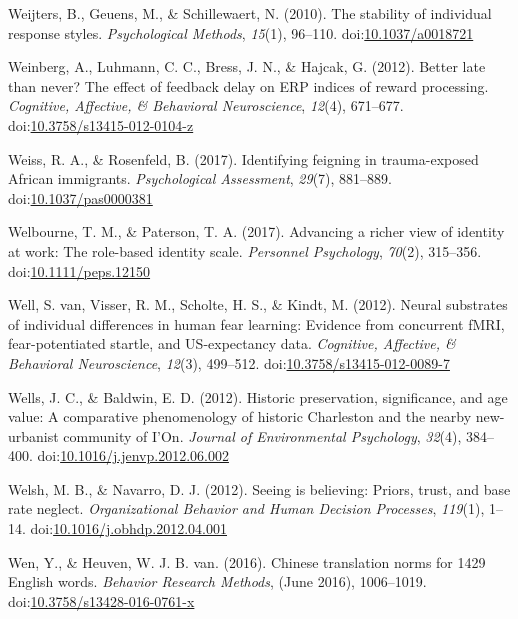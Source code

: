 \documentclass[english,man]{apa6}
\theoremstyle{definition}
\theoremstyle{definition}
\theoremstyle{definition}
\theoremstyle{remark}
\begin{document}
\hypertarget{ref-Weijters2010}{}
Weijters, B., Geuens, M., \& Schillewaert, N. (2010). The stability of
individual response styles. \emph{Psychological Methods}, \emph{15}(1),
96--110. doi:\href{https://doi.org/10.1037/a0018721}{10.1037/a0018721}

\hypertarget{ref-Weinberg2012}{}
Weinberg, A., Luhmann, C. C., Bress, J. N., \& Hajcak, G. (2012). Better
late than never? The effect of feedback delay on ERP indices of reward
processing. \emph{Cognitive, Affective, \& Behavioral Neuroscience},
\emph{12}(4), 671--677.
doi:\href{https://doi.org/10.3758/s13415-012-0104-z}{10.3758/s13415-012-0104-z}

\hypertarget{ref-Weiss2017}{}
Weiss, R. A., \& Rosenfeld, B. (2017). Identifying feigning in
trauma-exposed African immigrants. \emph{Psychological Assessment},
\emph{29}(7), 881--889.
doi:\href{https://doi.org/10.1037/pas0000381}{10.1037/pas0000381}

\hypertarget{ref-Welbourne2017}{}
Welbourne, T. M., \& Paterson, T. A. (2017). Advancing a richer view of
identity at work: The role-based identity scale. \emph{Personnel
Psychology}, \emph{70}(2), 315--356.
doi:\href{https://doi.org/10.1111/peps.12150}{10.1111/peps.12150}

\hypertarget{ref-VanWell2012}{}
Well, S. van, Visser, R. M., Scholte, H. S., \& Kindt, M. (2012). Neural
substrates of individual differences in human fear learning: Evidence
from concurrent fMRI, fear-potentiated startle, and US-expectancy data.
\emph{Cognitive, Affective, \& Behavioral Neuroscience}, \emph{12}(3),
499--512.
doi:\href{https://doi.org/10.3758/s13415-012-0089-7}{10.3758/s13415-012-0089-7}

\hypertarget{ref-Wells2012}{}
Wells, J. C., \& Baldwin, E. D. (2012). Historic preservation,
significance, and age value: A comparative phenomenology of historic
Charleston and the nearby new-urbanist community of I'On. \emph{Journal
of Environmental Psychology}, \emph{32}(4), 384--400.
doi:\href{https://doi.org/10.1016/j.jenvp.2012.06.002}{10.1016/j.jenvp.2012.06.002}

\hypertarget{ref-Welsh2012}{}
Welsh, M. B., \& Navarro, D. J. (2012). Seeing is believing: Priors,
trust, and base rate neglect. \emph{Organizational Behavior and Human
Decision Processes}, \emph{119}(1), 1--14.
doi:\href{https://doi.org/10.1016/j.obhdp.2012.04.001}{10.1016/j.obhdp.2012.04.001}

\hypertarget{ref-Wen2016}{}
Wen, Y., \& Heuven, W. J. B. van. (2016). Chinese translation norms for
1429 English words. \emph{Behavior Research Methods}, (June 2016),
1006--1019.
doi:\href{https://doi.org/10.3758/s13428-016-0761-x}{10.3758/s13428-016-0761-x}
\end{document}
